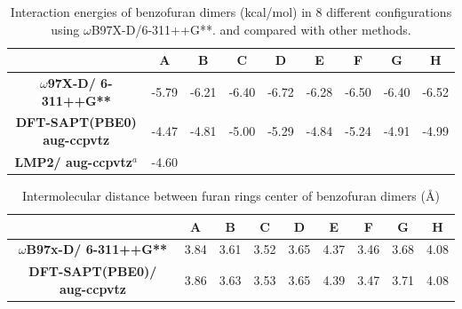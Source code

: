 \begin{table}[htbp]
	\caption{Interaction energies of benzofuran dimers (kcal/mol) in 8 different configurations using $\omega$B97X-D/6-311++G**. and compared with other methods.}
	\begin{tabular}{ccccccccc}
		\toprule
		\multicolumn{1}{l}{} & \textbf{A} & \textbf{B} & \textbf{C} & \textbf{D} & \textbf{E} & \textbf{F} & \textbf{G} & \textbf{H} \\ 
		\midrule
		\textbf{$\omega$97X-D/
		6-311++G**} & -5.79 & -6.21 & -6.40 & -6.72 & \multicolumn{1}{l}{-6.28} & -6.50 & -6.40 & -6.52 \\ 
		\textbf{DFT-SAPT(PBE0)
		aug-ccpvtz} & -4.47 & -4.81 & -5.00 & -5.29 & -4.84 & -5.24 & -4.91 & -4.99 \\ 
		\textbf{LMP2/ aug-ccpvtz}$^{a}$ & -4.60 &  &  &  &  &  &  &  \\ 
		\bottomrule
	\end{tabular}
	\label{}
\end{table}



\begin{table}[htbp]
	\caption{Intermolecular distance between furan rings center of benzofuran dimers (Å)}
	\begin{tabular}{cllllllll}
		\toprule
		\multicolumn{1}{l}{} & \multicolumn{1}{c}{\textbf{A}} & \multicolumn{1}{c}{\textbf{B}} & \multicolumn{1}{c}{\textbf{C}} & \multicolumn{1}{c}{\textbf{D}} & \multicolumn{1}{c}{\textbf{E}} & \multicolumn{1}{c}{\textbf{F}} & \multicolumn{1}{c}{\textbf{G}} & \multicolumn{1}{c}{\textbf{H}} \\ 
		\midrule
		\textbf{$\omega$B97x-D/
			6-311++G**} & 3.84 & 3.61 & 3.52 & 3.65 &4.37  & 3.46 & 3.68 & 4.08 \\ 
		\textbf{DFT-SAPT(PBE0)/
			aug-ccpvtz} & 3.86 & 3.63 & 3.53 & 3.65 & 4.39 & 3.47 & 3.71 & 4.08 \\ 
		\bottomrule
	\end{tabular}
	\label{}
\end{table}


